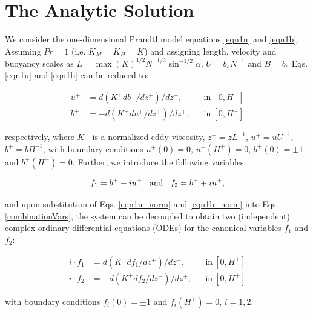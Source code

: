 \section{The Analytic Solution}
%
We consider the one-dimensional Prandtl model equations \ref{eqn1u} and \ref{eqn1b}. Assuming $Pr=1$ (i.e. $K_M=K_H=K$) and assigning length, velocity and buoyancy scales as $L=\max{(K)}^{1/2} N^{-1/2} \sin^{-1/2}{\alpha}$, $U=b_s N^{-1}$ and $B=b_s$ Eqs. \ref{eqn1u} and \ref{eqn1b} can be reduced to:
%
\begin{linenomath*}
\begin{subequations}
\label{ode}
\begin{align}
	u^+& = d( K^+ db^+/dz^+ )/dz^+, && \mathrm{in}  \ [0,H^+]
	\label{eqn1u_norm} \\
	b^+ & = -d( K^+ du^+/dz^+ )/dz^+, &&\mathrm{in}  \ [0,H^+]
	\label{eqn1b_norm}
\end{align}
\end{subequations}
\end{linenomath*}
%
respectively, where $K^+$ is a normalized eddy viscosity, $z^+=zL^{-1}$, $u^+ = uU^{-1}$, $b^+=b B^{-1}$, with boundary conditions $u^+(0)=0$, $u^+(H^+) = 0$, $b^+(0)=\pm 1$ and $b^+(H^+) = 0$.
%
Further, we introduce the following variables 
%
\begin{linenomath*}
\begin{equation}
   f_1= b^+ - i u^+ \hspace{3mm} \textrm{and} \hspace{3mm} f_2=b^+ + iu^+,
   \label{combinationVars}
\end{equation}
\end{linenomath*}
%
and upon substitution of Eqs. \ref{eqn1u_norm} and \ref{eqn1b_norm} into Eqs. \ref{combinationVars}, the system can be decoupled to obtain two (independent) complex ordinary differential equations (ODEs) for the canonical variables $f_1$ and $f_2$:
%
\begin{linenomath*}
\begin{subequations}
\label{ode_norm}
\begin{align}
	i \cdot f_1 &=  d(  K^+ df_1/dz^+ )/dz^+, && \mathrm{in}  \ [0,H^+]
	\label{ode1} \\
	i \cdot f_2 &= - d( K^+ df_2/dz^+ )/dz^+, && \mathrm{in}  \ [0,H^+]
	\label{ode2}
\end{align}
\end{subequations}
\end{linenomath*}
%
with boundary conditions $f_i(0)=\pm 1$ and $f_i(H^+) = 0$, $i=1,2$.

